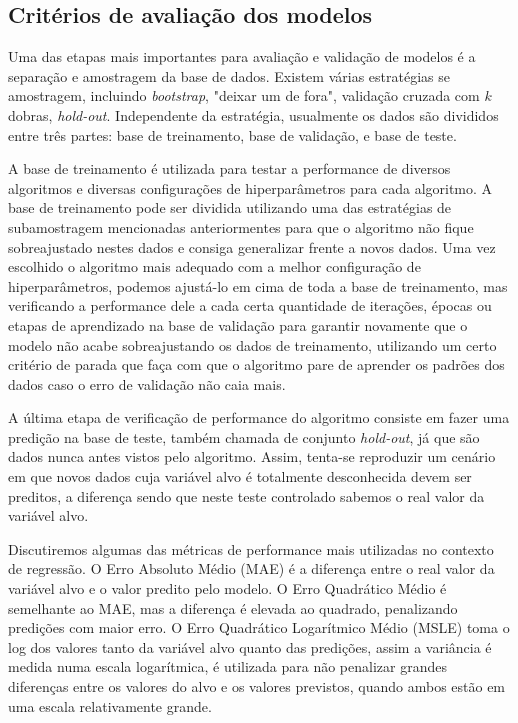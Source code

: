 \documentclass[twocolumn]{rbef}
\newcommand{\1}{\mathbbm{1}}
\begin{document}
\subsection{Critérios de avaliação dos modelos} \label{subsection22}

Uma das etapas mais importantes para avaliação e validação de modelos é a separação e amostragem da base de dados. Existem várias estratégias se amostragem, incluindo \textit{bootstrap}, "deixar um de fora", validação cruzada com $k$ dobras, \textit{hold-out}. Independente da estratégia, usualmente os dados são divididos entre três partes: base de treinamento, base de validação, e base de teste\cite{James}.

A base de treinamento é utilizada para testar a performance de diversos algoritmos e diversas configurações de hiperparâmetros para cada algoritmo. A base de treinamento pode ser dividida utilizando uma das estratégias de subamostragem mencionadas anteriormentes para que o algoritmo não fique sobreajustado nestes dados e consiga generalizar frente a novos dados. Uma vez escolhido o algoritmo mais adequado com a melhor configuração de hiperparâmetros, podemos ajustá-lo em cima de toda a base de treinamento, mas verificando a performance dele a cada certa quantidade de iterações, épocas ou etapas de aprendizado na base de validação para garantir novamente que o modelo não acabe sobreajustando os dados de treinamento, utilizando um certo critério de parada que faça com que o algoritmo pare de aprender os padrões dos dados caso o erro de validação não caia mais.

A última etapa de verificação de performance do algoritmo consiste em fazer uma predição na base de teste, também chamada de conjunto \textit{hold-out}, já que são dados nunca antes vistos pelo algoritmo. Assim, tenta-se reproduzir um cenário em que novos dados cuja variável alvo é totalmente desconhecida devem ser preditos, a diferença sendo que neste teste controlado sabemos o real valor da variável alvo.

Discutiremos algumas das métricas de performance mais utilizadas no contexto de regressão. O Erro Absoluto Médio (MAE) é a diferença entre o real valor da variável alvo e o valor predito pelo modelo. O Erro Quadrático Médio é semelhante ao MAE, mas a diferença é elevada ao quadrado, penalizando predições com maior erro. O Erro Quadrático Logarítmico Médio (MSLE) toma o log dos valores tanto da variável alvo quanto das predições, assim a variância é medida numa escala logarítmica, é utilizada para não penalizar grandes diferenças entre os valores do alvo e os valores previstos, quando ambos estão em uma escala relativamente grande.
\end{document}
